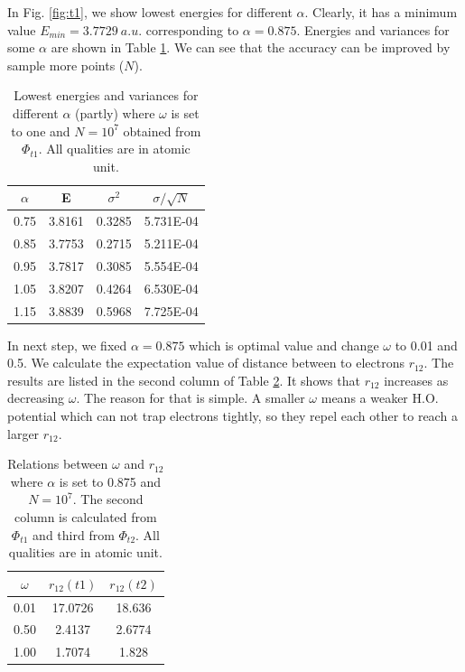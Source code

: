 In Fig. \ref{fig:t1}, we show lowest energies for different $\alpha$. 
Clearly, it has a minimum value $E_{min}=3.7729\ a.u.$ corresponding to $\alpha=0.875$.
Energies and variances for some $\alpha$ are shown in Table \ref{tab:t1}.
We can see that the accuracy can be improved by sample more points ($N$).
\begin{table}[tb]
	\centering
	\caption{Lowest energies and variances for   different $\alpha$ (partly) where $\omega$ is set to one and $N=10^7$ obtained from $\Phi_{t1}$. All qualities are in atomic unit.}
	\label{tab:t1}
	\begin{tabular}{cccc}
		\hline
		\hline
		$\alpha$   & E & $\sigma^2$ & $\sigma/\sqrt{N}$ \\
		\hline
		0.75 &3.8161 &0.3285 &5.731E-04 \\
		0.85 &3.7753 &0.2715 &5.211E-04 \\
		0.95 &3.7817 &0.3085 &5.554E-04 \\
		1.05 &3.8207 &0.4264 &6.530E-04 \\
		1.15 &3.8839 &0.5968 &7.725E-04 \\
		\hline
		\hline
	\end{tabular}
\end{table}
In next step, we fixed $\alpha=0.875$ which is optimal value and change $\omega$ to 0.01 and 0.5.
We calculate the expectation value of distance between to electrons $r_{12}$. 
The results are listed in the second column of Table \ref{tab:t12}.
It shows that $r_{12}$ increases as decreasing $\omega$.
The reason for that is simple.
A smaller $\omega$ means a weaker H.O. potential which can not trap electrons tightly, so they repel each other to reach a larger $r_{12}$.
\begin{table}[tb]
	\centering
	\caption{Relations between $\omega$ and $r_{12}$ where $\alpha$ is set to 0.875 and $N=10^7$. The second column is calculated from $\Phi_{t1}$ and third from $\Phi_{t2}$. All qualities are in atomic unit.}
	\label{tab:t12}
	\begin{tabular}{ccc}
		\hline
		\hline
		$\omega$   & $r_{12}(t1)$ &$r_{12}(t2)$ \\
		\hline
		0.01 &17.0726 &18.636  \\
		0.50 &2.4137 &2.6774  \\
		1.00 &1.7074 &1.828  \\
		\hline
		\hline
	\end{tabular}
\end{table}
